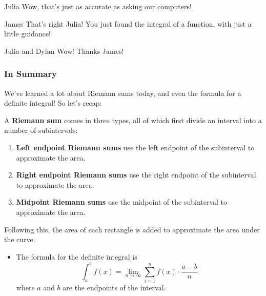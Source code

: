 \documentclass{ximera}
\begin{document}
\begin{dialogue}
\item[Julia] Wow, that's just as accurate as asking our computers!
\item[James] That's right Julia! You just found the integral of a function, with just a little guidance!
\item[Julia and Dylan] Wow! Thanks James!
\end{dialogue}

\subsubsection{In Summary}
We've learned a lot about Riemann sums today, and even the formula for a definite integral! So let's recap:
\begin{definition}
A \textbf{Riemann sum} comes in three types, all of which first divide an interval into a number of subintervals:
\begin{enumerate}
\item{\textbf{Left endpoint Riemann sums} use the left endpoint of the subinterval to approximate the area.}
\item{\textbf{Right endpoint Riemann sums} use the right endpoint of the subinterval to approximate the area.}
\item{\textbf{Midpoint Riemann sums} use the midpoint of the subinterval to approximate the area.}
\end{enumerate}
Following this, the area of each rectangle is added to approximate the area under the curve.
\end{definition}

\begin{itemize}
\item{The formula for the definite integral is $$\displaystyle \int_a^b f(x) = \lim_{n\to\infty} \sum_{i=1}^n f(x) \cdot \frac{a-b}{n}$$where $a$ and $b$ are the endpoints of the interval.}
\end{itemize}
\pagebreak
\end{document}
